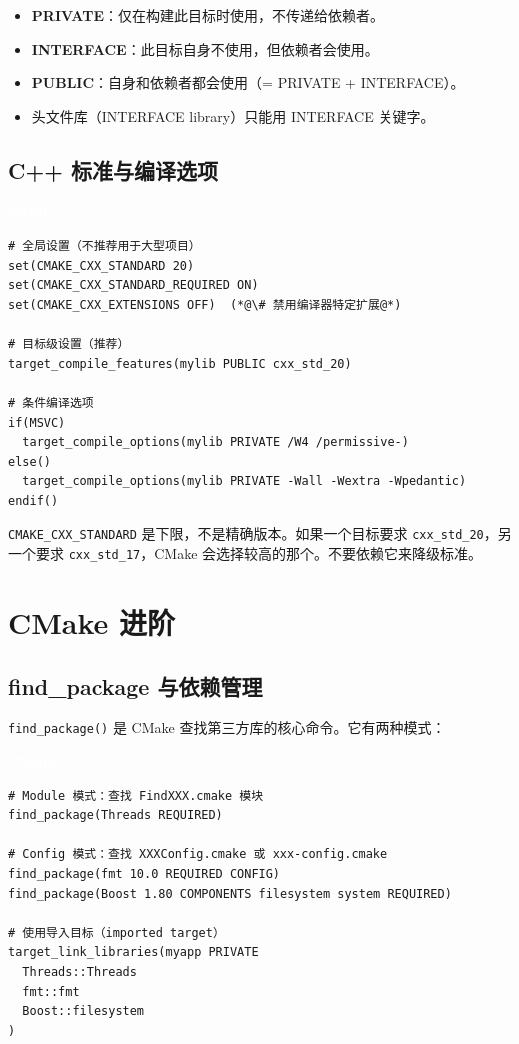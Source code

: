 \documentclass[12pt,a4paper,fontset=fandol]{ctexbook}
\newcommand{\Fn}[1]{\texttt{#1()}}
\newcommand{\Tp}[1]{\texttt{#1}}
\newcommand{\cmakelabel}{%
  \noindent\begin{tcolorbox}[sharp corners,colback=cmakeheadbg,colframe=cmakeheadbg,
    left=6pt,right=6pt,top=2pt,bottom=2pt,boxrule=0pt]
  \textcolor{white}{\small\bfseries\sffamily CMake}\end{tcolorbox}%
}
\begin{document}
\begin{bestpractice}[title=PRIVATE / INTERFACE / PUBLIC 的语义]
\begin{itemize}
  \item \textbf{PRIVATE}：仅在构建此目标时使用，不传递给依赖者。
  \item \textbf{INTERFACE}：此目标自身不使用，但依赖者会使用。
  \item \textbf{PUBLIC}：自身和依赖者都会使用（= PRIVATE + INTERFACE）。
  \item 头文件库（INTERFACE library）只能用 INTERFACE 关键字。
\end{itemize}
\end{bestpractice}

\section{C++ 标准与编译选项}

\cmakelabel
\begin{lstlisting}[style=cmakestyle]
# 全局设置（不推荐用于大型项目）
set(CMAKE_CXX_STANDARD 20)
set(CMAKE_CXX_STANDARD_REQUIRED ON)
set(CMAKE_CXX_EXTENSIONS OFF)  (*@\# 禁用编译器特定扩展@*)

# 目标级设置（推荐）
target_compile_features(mylib PUBLIC cxx_std_20)

# 条件编译选项
if(MSVC)
  target_compile_options(mylib PRIVATE /W4 /permissive-)
else()
  target_compile_options(mylib PRIVATE -Wall -Wextra -Wpedantic)
endif()
\end{lstlisting}

\begin{warning}
\Tp{CMAKE\_CXX\_STANDARD} 是下限，不是精确版本。如果一个目标要求 \Tp{cxx\_std\_20}，另一个要求 \Tp{cxx\_std\_17}，CMake 会选择较高的那个。不要依赖它来降级标准。
\end{warning}

\chapter{CMake 进阶}

\section{find\_package 与依赖管理}

\Fn{find\_package} 是 CMake 查找第三方库的核心命令。它有两种模式：

\cmakelabel
\begin{lstlisting}[style=cmakestyle]
# Module 模式：查找 FindXXX.cmake 模块
find_package(Threads REQUIRED)

# Config 模式：查找 XXXConfig.cmake 或 xxx-config.cmake
find_package(fmt 10.0 REQUIRED CONFIG)
find_package(Boost 1.80 COMPONENTS filesystem system REQUIRED)

# 使用导入目标（imported target）
target_link_libraries(myapp PRIVATE
  Threads::Threads
  fmt::fmt
  Boost::filesystem
)
\end{lstlisting}
\end{document}
